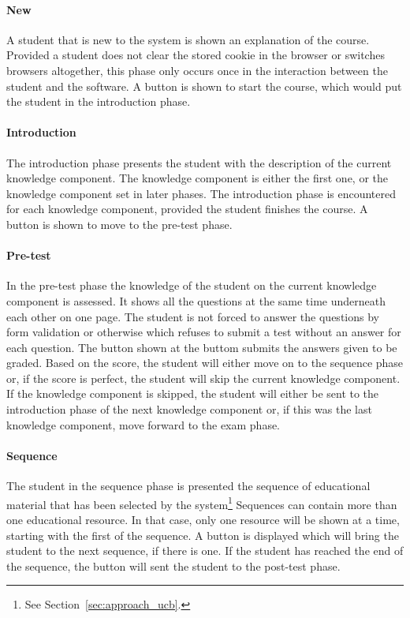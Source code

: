 \paragraph{New} A student that is new to the system is shown an explanation of
the course. Provided a student does not clear the stored cookie in the browser
or switches browsers altogether, this phase only occurs once in the interaction
between the student and the software. A button is shown to start the course,
which would put the student in the introduction phase.
\paragraph{Introduction} The introduction phase presents the student with the
description of the current knowledge component. The knowledge component is
either the first one, or the knowledge component set in later phases. The
introduction phase is encountered for each knowledge component, provided the
student finishes the course. A button is shown to move to the pre-test phase.
\paragraph{Pre-test} In the pre-test phase the knowledge of the student on the
current knowledge component is assessed. It shows all the questions at the same
time underneath each other on one page. The student is not forced to answer the
questions by form validation or otherwise which refuses to submit a test
without an answer for each question. The button shown at the buttom submits the
answers given to be graded. Based on the score, the student will either move on
to the sequence phase or, if the score is perfect, the student will skip the
current knowledge component. If the knowledge component is skipped, the student
will either be sent to the introduction phase of the next knowledge component
or, if this was the last knowledge component, move forward to the exam phase.
\paragraph{Sequence} The student in the sequence phase is presented the
sequence of educational material that has been selected by the
system\footnote{See Section~\ref{sec:approach_ucb}.} Sequences can contain more
than one educational resource. In that case, only one resource will be shown at
a time, starting with the first of the sequence. A button is displayed which
will bring the student to the next sequence, if there is one. If the student
has reached the end of the sequence, the button will sent the student to the
post-test phase.
